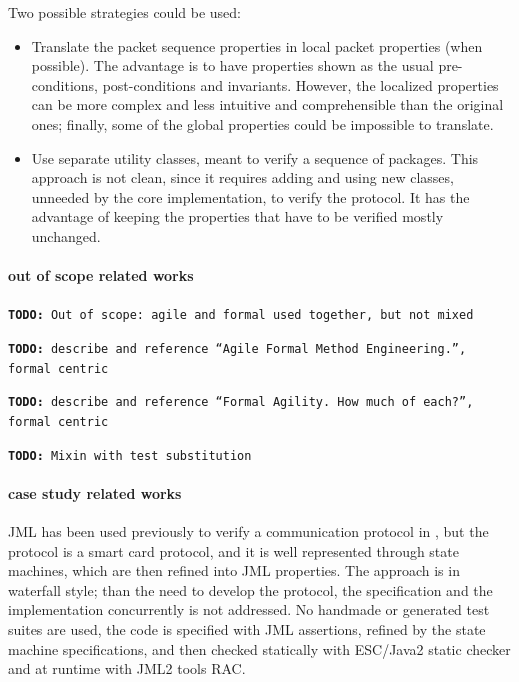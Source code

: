 \documentclass[english]{lni}
\newcommand{\todo}[1]{\texttt{\textbf{TODO:} #1}}
\begin{document}
Two possible strategies could be used:
\begin{itemize}
\item Translate the packet sequence properties in local packet properties (when possible).  
The advantage is to have properties shown as the usual pre-conditions, post-conditions and invariants.  
However, the localized properties can be more complex and less intuitive and comprehensible than the original ones; finally, some of the global properties could be impossible to translate.
\item Use separate utility classes, meant to verify a sequence of packages.  
This approach is not clean, since it requires adding and using new classes, unneeded by the core implementation, to verify the protocol.  It has the advantage of keeping the properties that have to be verified mostly unchanged.
\end{itemize}

\paragraph*{out of scope related works}

\todo{Out of scope: agile and formal used together, but not mixed}

\todo{describe and reference ``Agile Formal Method Engineering.'', formal centric}

\todo{describe and reference ``Formal Agility. How much of each?'', formal centric}

\todo{Mixin with test substitution}

\paragraph*{case study related works}

JML has been used previously to verify a communication protocol in \cite{Hubbers2004}, but the protocol is a smart card protocol, and it
is well represented through state machines, which are then refined into JML properties.  
The approach is in waterfall style; than the need to develop the protocol, the specification and the implementation concurrently is not addressed.  
No handmade or generated test suites are used, the code is specified with JML assertions, refined by the state machine specifications, and then checked statically with ESC/Java2 static checker\cite{CokKiniry04} and at runtime with JML2 tools RAC\cite{BurdyEtal05-STTT}.
\end{document}
